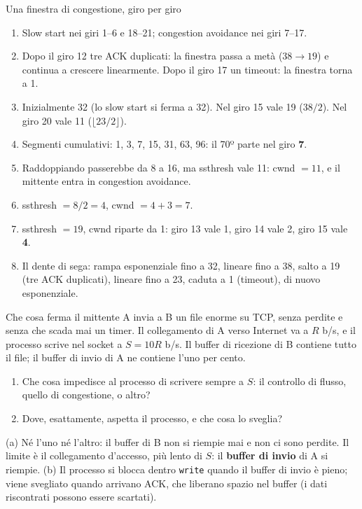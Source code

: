\begin{esercizio}{Una finestra di congestione, giro per giro}
\svolgimento
\begin{enumerate}[label=(\alph*)]
    \item Slow start nei giri 1--6 e 18--21; congestion avoidance nei giri 7--17.
    \item Dopo il giro 12 tre ACK duplicati: la finestra passa a metà ($38 \rightarrow 19$) e continua a crescere linearmente. Dopo il giro
          17 un timeout: la finestra torna a 1.
    \item Inizialmente 32 (lo slow start si ferma a 32). Nel giro 15 vale 19 ($38/2$). Nel giro 20 vale 11 ($\lfloor 23/2 \rfloor$).
    \item Segmenti cumulativi: 1, 3, 7, 15, 31, 63, 96: il 70º parte nel giro \textbf{7}.
    \item Raddoppiando passerebbe da 8 a 16, ma ssthresh vale 11: cwnd $= 11$, e il mittente entra in congestion avoidance.
    \item ssthresh $= 8/2 = 4$, cwnd $= 4 + 3 = 7$.
    \item ssthresh $= 19$, cwnd riparte da 1: giro 13 vale 1, giro 14 vale 2, giro 15 vale \textbf{4}.
    \item Il dente di sega: rampa esponenziale fino a 32, lineare fino a 38, salto a 19 (tre ACK duplicati), lineare fino a 23, caduta a 1
          (timeout), di nuovo esponenziale.
\end{enumerate}
\end{esercizio}

\begin{esercizio}{Che cosa ferma il mittente}
A invia a B un file enorme su TCP, senza perdite e senza che scada mai un timer. Il collegamento di A verso Internet va a $R$ b/s, e il
processo scrive nel socket a $S = 10R$ b/s. Il buffer di ricezione di B contiene tutto il file; il buffer di invio di A ne contiene l'uno
per cento.
\begin{enumerate}[label=(\alph*)]
    \item Che cosa impedisce al processo di scrivere sempre a $S$: il controllo di flusso, quello di congestione, o altro?
    \item Dove, esattamente, aspetta il processo, e che cosa lo sveglia?
\end{enumerate}

\svolgimento
(a) Né l'uno né l'altro: il buffer di B non si riempie mai e non ci sono perdite. Il limite è il collegamento d'accesso, più lento di $S$:
il \textbf{buffer di invio} di A si riempie. (b) Il processo si blocca dentro \texttt{write} quando il buffer di invio è pieno; viene
svegliato quando arrivano ACK, che liberano spazio nel buffer (i dati riscontrati possono essere scartati).
\end{esercizio}

